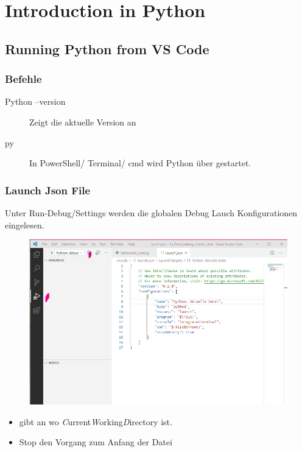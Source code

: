 \section{Introduction in Python}
\subsection{Running Python from VS Code}
\subsubsection{Befehle}
\begin{description}
	\item[Python --version] Zeigt die aktuelle Version an
	\item[py] In PowerShell/ Terminal/ cmd wird Python über  gestartet.
\end{description}
\subsubsection{Launch Json File}
Unter Run-Debug/Settings werden die globalen Debug Lauch Konfigurationen eingelesen.
\begin{figure}[H]
\centering
\includegraphics[scale = 0.3]{attachment/chapter_3/Scc069}
\caption{}
\label{fig:Scc069}
\end{figure}
\begin{itemize}
\item {} gibt an wo \textit{C}urrent\textit{W}orking\textit{D}irectory ist.
\item {} Stop den Vorgang zum Anfang der Datei
\end{itemize}

